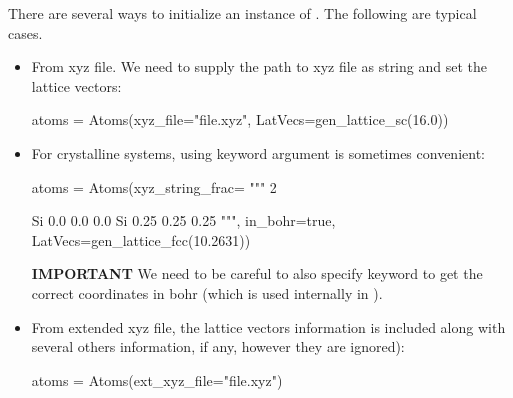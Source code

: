 There are several ways to initialize an instance of . The following
are typical cases.
%
\begin{itemize}
%
\item From xyz file. We need to supply the path to xyz file as string and
set the lattice vectors:
%
\begin{juliacode}
atoms = Atoms(xyz_file="file.xyz", LatVecs=gen_lattice_sc(16.0))
\end{juliacode}
%
\item For crystalline systems, using keyword argument 
is sometimes convenient:
%
\begin{juliacode}
atoms = Atoms(xyz_string_frac=
        """
        2

        Si  0.0  0.0  0.0
        Si  0.25  0.25  0.25
        """, in_bohr=true,
        LatVecs=gen_lattice_fcc(10.2631))
\end{juliacode}
%
\textbf{IMPORTANT} We need to be careful to also specify  keyword to get
the correct coordinates in bohr (which is used internally in ).
%
\item From extended xyz file, the lattice vectors information is included
along with several others information, if any, however they are ignored):
%
\begin{juliacode}
atoms = Atoms(ext_xyz_file="file.xyz")
\end{juliacode}
%
\end{itemize}
